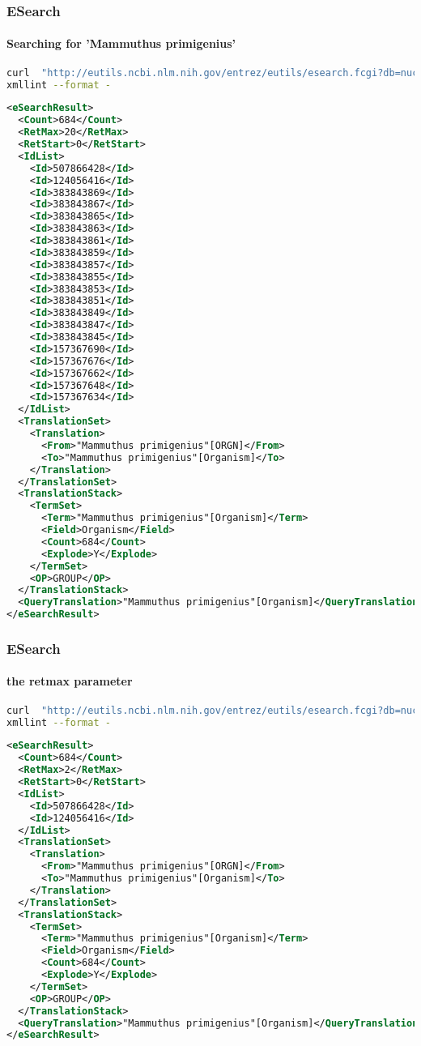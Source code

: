\documentclass{beamer}
\begin{document}
\begin{frame}[fragile]
\frametitle{ESearch}
\framesubtitle{Searching for 'Mammuthus primigenius' }
\begin{lstlisting}[language=bash,basicstyle=\tiny,breaklines=true]
curl  "http://eutils.ncbi.nlm.nih.gov/entrez/eutils/esearch.fcgi?db=nucleotide&term=%22Mammuthus%20primigenius%22%5BORGN%5D" |\
xmllint --format -
\end{lstlisting}

\begin{lstlisting}[language=xml,basicstyle=\tiny,breaklines=false]
<eSearchResult>
  <Count>684</Count>
  <RetMax>20</RetMax>
  <RetStart>0</RetStart>
  <IdList>
    <Id>507866428</Id>
    <Id>124056416</Id>
    <Id>383843869</Id>
    <Id>383843867</Id>
    <Id>383843865</Id>
    <Id>383843863</Id>
    <Id>383843861</Id>
    <Id>383843859</Id>
    <Id>383843857</Id>
    <Id>383843855</Id>
    <Id>383843853</Id>
    <Id>383843851</Id>
    <Id>383843849</Id>
    <Id>383843847</Id>
    <Id>383843845</Id>
    <Id>157367690</Id>
    <Id>157367676</Id>
    <Id>157367662</Id>
    <Id>157367648</Id>
    <Id>157367634</Id>
  </IdList>
  <TranslationSet>
    <Translation>
      <From>"Mammuthus primigenius"[ORGN]</From>
      <To>"Mammuthus primigenius"[Organism]</To>
    </Translation>
  </TranslationSet>
  <TranslationStack>
    <TermSet>
      <Term>"Mammuthus primigenius"[Organism]</Term>
      <Field>Organism</Field>
      <Count>684</Count>
      <Explode>Y</Explode>
    </TermSet>
    <OP>GROUP</OP>
  </TranslationStack>
  <QueryTranslation>"Mammuthus primigenius"[Organism]</QueryTranslation>
</eSearchResult>
\end{lstlisting}
\end{frame}

\begin{frame}[fragile]
\frametitle{ESearch}
\framesubtitle{the retmax parameter }
\begin{lstlisting}[language=bash,basicstyle=\tiny,breaklines=true]
curl  "http://eutils.ncbi.nlm.nih.gov/entrez/eutils/esearch.fcgi?db=nucleotide&term=%22Mammuthus%20primigenius%22%5BORGN%5D&retmax=2" |\
xmllint --format -
\end{lstlisting}

\begin{lstlisting}[language=xml,basicstyle=\tiny,breaklines=false]
<eSearchResult>
  <Count>684</Count>
  <RetMax>2</RetMax>
  <RetStart>0</RetStart>
  <IdList>
    <Id>507866428</Id>
    <Id>124056416</Id>
  </IdList>
  <TranslationSet>
    <Translation>
      <From>"Mammuthus primigenius"[ORGN]</From>
      <To>"Mammuthus primigenius"[Organism]</To>
    </Translation>
  </TranslationSet>
  <TranslationStack>
    <TermSet>
      <Term>"Mammuthus primigenius"[Organism]</Term>
      <Field>Organism</Field>
      <Count>684</Count>
      <Explode>Y</Explode>
    </TermSet>
    <OP>GROUP</OP>
  </TranslationStack>
  <QueryTranslation>"Mammuthus primigenius"[Organism]</QueryTranslation>
</eSearchResult>
\end{lstlisting}
\end{frame}
\end{document}
